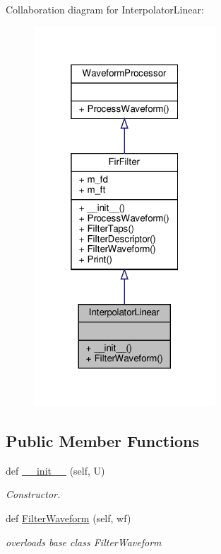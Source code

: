 Collaboration diagram for Interpolator\+Linear\+:
\nopagebreak
\begin{figure}[H]
\begin{center}
\leavevmode
\includegraphics[width=193pt]{classSignalIntegrity_1_1TimeDomain_1_1Filters_1_1InterpolatorLinear_1_1InterpolatorLinear__coll__graph}
\end{center}
\end{figure}
\subsection*{Public Member Functions}
\begin{DoxyCompactItemize}
\item 
def \hyperlink{classSignalIntegrity_1_1TimeDomain_1_1Filters_1_1InterpolatorLinear_1_1InterpolatorLinear_abff7619574bd23d3249b999fcc5bc87b}{\+\_\+\+\_\+init\+\_\+\+\_\+} (self, U)
\begin{DoxyCompactList}\small\item\em Constructor. \end{DoxyCompactList}\item 
def \hyperlink{classSignalIntegrity_1_1TimeDomain_1_1Filters_1_1InterpolatorLinear_1_1InterpolatorLinear_a84e73c18250ca4a61482f94ad61e735b}{Filter\+Waveform} (self, wf)
\begin{DoxyCompactList}\small\item\em overloads base class Filter\+Waveform \end{DoxyCompactList}\end{DoxyCompactItemize}


